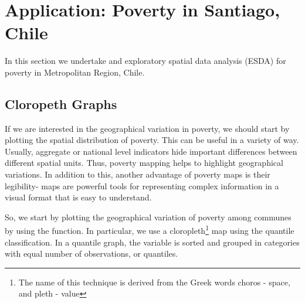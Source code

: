 


\section{Application: Poverty in Santiago, Chile}

In this section we undertake and exploratory spatial data analysis (ESDA) for poverty in Metropolitan Region, Chile.  


\subsection{Cloropeth Graphs}

If we are interested in the geographical variation in poverty, we should start by plotting the spatial distribution of poverty.  This can be useful in a variety of way.  Usually, aggregate or national level indicators hide important differences between different spatial units. Thus, poverty mapping helps to highlight geographical variations.  In addition to this, another advantage of poverty maps is their legibility- maps are powerful tools for representing complex information in a visual format that is easy to understand. 

So, we start by plotting the geographical variation of poverty among communes by using the  function. In particular, we use a cloropleth\footnote{The name of this technique is derived from the Greek words choros - space, and pleth - value} map using the quantile classification. In a quantile graph, the variable is sorted and grouped in categories with equal number of observations, or quantiles. 


